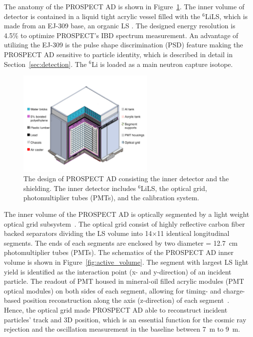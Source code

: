     The anatomy of the PROSPECT AD is shown in Figure~\ref{fig:PROSPECT_AD}.
    The inner volume of detector is contained in a liquid tight acrylic vessel filled with the $^{6}$LiLS, which is made from an EJ-309 base, an organic LS \cite{bib:lspaper}.
    The designed energy resolution is 4.5\% to optimize PROSPECT's IBD spectrum measurement.
    An advantage of utilizing the EJ-309 is the pulse shape discrimination (PSD) feature making the PROSPECT AD sensitive to particle identity, which is described in detail in Section~\ref{sec:detection}.
    The $^{6}$Li is loaded as a main neutron capture isotope.

\begin{figure}
    \centering
    \includegraphics[trim = 0cm 2cm 0cm 2cm, clip,width=0.6\textwidth]{Figures/DetectorDesign.pdf}
    \caption[The design of PROSPECT AD]{The design of PROSPECT AD consisting the inner detector and the shielding.
    The inner detector includes $^{6}$LiLS, the optical grid, photomultiplier tubes (PMTs), and the calibration system.
    }
    \label{fig:PROSPECT_AD}
\end{figure}

    The inner volume of the PROSPECT AD is optically segmented by a light weight optical grid subsystem~\cite{bib:prospect_og}.
    The optical grid consist of highly reflective carbon fiber backed separators dividing the LS volume into 14$\times$11 identical longitudinal segments. 
    The ends of each segments are enclosed by two diameter = 12.7~cm photomultiplier tubes (PMTs).
    The schematics of the PROSPECT AD inner volume is shown in Figure~\ref{fig:active_volume}.
    The segment with largest LS light yield is identified as the interaction point (x- and y-direction) of an incident particle.
    The readout of PMT housed in mineral-oil filled acrylic modules (PMT optical modules) on both sides of each segment, allowing for timing- and charge-based position reconstruction along the axis (z-direction) of each segment~\cite{bib:prospect_50, bib:P20}.
    Hence, the optical grid made PROSPECT AD able to reconstruct incident particles' track and 3D position, which is an essential function for the cosmic ray rejection and the oscillation measurement in the baseline between 7~m to 9~m.
    
